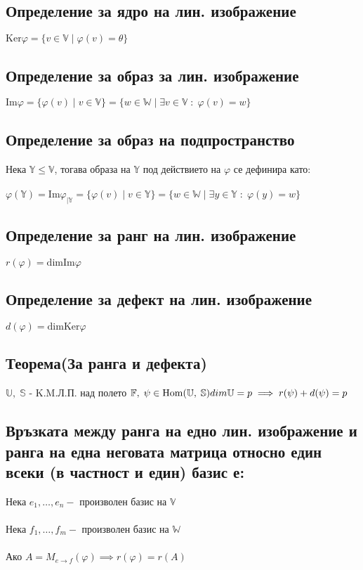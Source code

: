 \documentclass{article}
\newcommand{\V}{\mathbb{V}}
\newcommand{\F}{\mathbb{F}}
\newcommand{\W}{\mathbb{W}}
\newcommand{\UV}{\mathbb{U}}
\newcommand{\n}[1]{#1_1, \dots, #1_n}
\newcommand{\m}[1]{#1_1, \dots, #1_m}
\newcommand{\OV}{\theta}
\begin{document}
    \subsection{Определение за ядро на лин. изображение}
    \(\mathrm{Ker} \varphi = \{v \in \V \; | \; \varphi(v) =\OV\}\)
    \subsection{Определение за образ за лин. изображение}
    \(\mathrm{Im} \varphi = \{\varphi(v) \; | \; v \in \V\} = \{w \in \W \; | \; \exists v \in \V \; : \; \varphi(v) = w \}\)
    \subsection{Определение за образ на подпространство}
    Нека \(\mathbb{Y} \leq \V\), тогава образа на \(\mathbb{Y}\) под действието на \(\varphi\) се дефинира като: \\\\
    \(\varphi(\mathbb{Y}) = \mathrm{Im}\varphi_{|\mathbb{Y}}
    = \{\varphi(v) \; | \; v \in \mathbb{Y}\} = \{w \in \W \; | \; \exists y \in \mathbb{Y} \; : \; \varphi(y) = w \}\)
    \subsection{Определение за ранг на лин. изображение}
    \(r(\varphi) = \mathrm{dim}\mathrm{Im}\varphi\)
    \subsection{Определение за дефект на лин. изображение}
    \(d(\varphi) = \mathrm{dim}\mathrm{Ker}\varphi\)
    \subsection{Теорема(За ранга и дефекта)}
    \(\UV, \; \mathbb{S}\) - K.M.Л.П. над полето \(\F, \; \psi \in \mathrm{Hom}(\UV, \; \mathbb{S}) \\\\
    dim\UV = p \implies r(\psi) + d(\psi) = p\)
    \subsection{Връзката между ранга на едно лин. изображение и ранга на една неговата матрица относно един всеки (в частност и един) базис е:}
    Нека \(\n{e} - \text{ произволен базис на } \V\) \\\\
    Нека \(\m{f} - \text{ произволен базис на } \W\) \\\\
    Ако \(A = M_{e \to f}(\varphi) \implies r(\varphi) = r(A)\)
\end{document}
